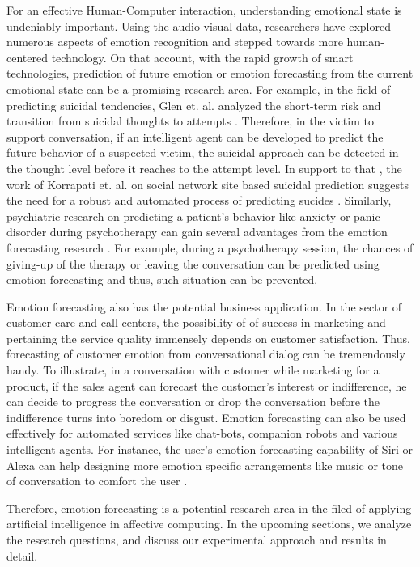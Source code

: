 For an effective Human-Computer interaction, understanding emotional state is undeniably important. Using the audio-visual data, researchers have explored numerous aspects of emotion recognition and stepped towards more human-centered technology\cite{bla2, bla1}. On that account, with the rapid growth of smart technologies, prediction of future emotion or emotion forecasting from the current emotional state can be a promising research area. For example, in the field of predicting suicidal tendencies, Glen et. al. analyzed the short-term risk and transition from suicidal thoughts to attempts \cite{suicide2}. Therefore, in the victim to support conversation, if an intelligent agent can be developed to predict the future behavior of a suspected victim, the suicidal approach can be detected in the thought level before it reaches to the attempt level. In support to that , the work of Korrapati et. al. on social network site based suicidal prediction suggests the need for a robust and automated process of predicting sucides \cite{suicide1}. Similarly, psychiatric research on predicting a patient's behavior like anxiety or panic disorder during psychotherapy can gain several advantages from the emotion forecasting research \cite{psy1, psy2}. For example, during a psychotherapy session, the chances of giving-up of the therapy or leaving the conversation can be predicted using emotion forecasting and thus, such situation can be prevented. 

Emotion forecasting also has the potential business application. In the sector of customer care and call centers, the possibility of of success in marketing and pertaining the service quality immensely depends on customer satisfaction. Thus, forecasting of customer emotion from conversational dialog can be tremendously handy. To illustrate, in a conversation with customer while marketing for a product, if the sales agent can forecast the customer's interest or indifference, he can decide to progress the conversation or drop the conversation before the indifference turns into boredom or disgust.  Emotion forecasting can also be used effectively for automated services like chat-bots, companion robots and various intelligent agents. For instance, the user's emotion forecasting capability of Siri or Alexa can help designing more emotion specific arrangements like music or tone of conversation to comfort the user \cite{siri,alexa}.

Therefore, emotion forecasting is a potential research area in the filed of applying artificial intelligence in affective computing. In the upcoming sections, we analyze the research questions, and discuss our experimental approach and results in detail. 

